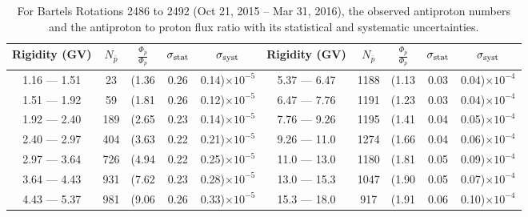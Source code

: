 \begin{table}[p] 
\renewcommand\baselinestretch{1.3}\selectfont
\setlength\tabcolsep{3pt}
\centering
\begin{tabular}{ccccc | ccccc}
\hline
\textbf{Rigidity}  (GV)  & $N_{\bar{p}}$ & $\frac{\Phi_{\bar{p}}}{\Phi_{p}}$ & $\sigma_{\rm{stat}}$ & $\sigma_{\rm{syst}}$ \hspace{1cm}   & \textbf{Rigidity}  (GV)  & $N_{\bar{p}}$ & $\frac{\Phi_{\bar{p}}}{\Phi_{p}}$ & $\sigma_{\rm{stat}}$ & $\sigma_{\rm{syst}}$ \hspace{1cm} \\ 
\hline
1.16 — 1.51   &  23                  &(1.36                          &  0.26              &      0.14)$\times 10^{-5}$  & 5.37 — 6.47                &  1188                    &(1.13                                &  0.03                   &      0.04)$\times 10^{-4}$\\
1.51 — 1.92   &  59                  &(1.81                          &  0.26              &      0.12)$\times 10^{-5}$  & 6.47 — 7.76                &  1191                    &(1.23                                &  0.03                   &      0.04)$\times 10^{-4}$\\
1.92 — 2.40   &  189                &(2.65                          &  0.23              &      0.14)$\times 10^{-5}$  & 7.76 — 9.26                &  1195                    &(1.41                                &  0.04                   &      0.05)$\times 10^{-4}$\\    
2.40 — 2.97   &  404                &(3.63                          &  0.22              &      0.21)$\times 10^{-5}$  & 9.26 — 11.0                &  1274                    &(1.66                                &  0.04                   &      0.06)$\times 10^{-4}$\\    
2.97 — 3.64   &  726                &(4.94                          &  0.22              &      0.25)$\times 10^{-5}$  & 11.0 — 13.0                 &  1180                    &(1.81                                &  0.05                   &      0.09)$\times 10^{-4}$\\
3.64 — 4.43   &  931                &(7.62                          &  0.23              &      0.28)$\times 10^{-5}$  & 13.0 — 15.3               &  1047                    &(1.90                                &  0.05                   &      0.07)$\times 10^{-4}$\\
4.43 — 5.37   &  981                &(9.06                          &  0.26              &      0.33)$\times 10^{-5}$  & 15.3 — 18.0               &  917                      &(1.91                                &  0.06                   &      0.10)$\times 10^{-4}$\\
\hline
\end{tabular}
\caption[Antiproton to proton flux ratio for Bartels Rotations 2486 to 2492]{For Bartels Rotations 2486 to 2492 (Oct 21, 2015 – Mar 31, 2016), the observed antiproton numbers and the antiproton to proton flux ratio with its statistical and systematic uncertainties.}
\label{TableOfDependent11}
\end{table}

